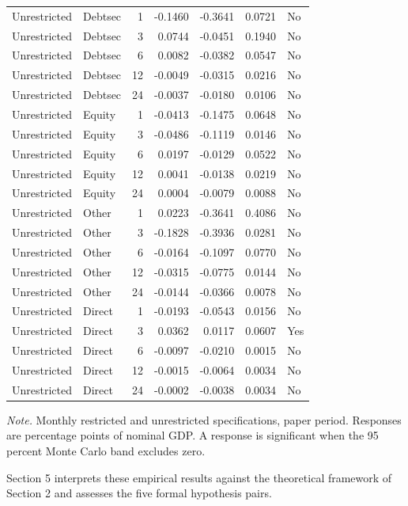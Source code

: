 \begin{longtable}{@{}l l r r r r l@{}}
Unrestricted & Debtsec & 1 & -0.1460 & -0.3641 & 0.0721 & No \\
Unrestricted & Debtsec & 3 & 0.0744 & -0.0451 & 0.1940 & No \\
Unrestricted & Debtsec & 6 & 0.0082 & -0.0382 & 0.0547 & No \\
Unrestricted & Debtsec & 12 & -0.0049 & -0.0315 & 0.0216 & No \\
Unrestricted & Debtsec & 24 & -0.0037 & -0.0180 & 0.0106 & No \\
Unrestricted & Equity & 1 & -0.0413 & -0.1475 & 0.0648 & No \\
Unrestricted & Equity & 3 & -0.0486 & -0.1119 & 0.0146 & No \\
Unrestricted & Equity & 6 & 0.0197 & -0.0129 & 0.0522 & No \\
Unrestricted & Equity & 12 & 0.0041 & -0.0138 & 0.0219 & No \\
Unrestricted & Equity & 24 & 0.0004 & -0.0079 & 0.0088 & No \\
Unrestricted & Other & 1 & 0.0223 & -0.3641 & 0.4086 & No \\
Unrestricted & Other & 3 & -0.1828 & -0.3936 & 0.0281 & No \\
Unrestricted & Other & 6 & -0.0164 & -0.1097 & 0.0770 & No \\
Unrestricted & Other & 12 & -0.0315 & -0.0775 & 0.0144 & No \\
Unrestricted & Other & 24 & -0.0144 & -0.0366 & 0.0078 & No \\
Unrestricted & Direct & 1 & -0.0193 & -0.0543 & 0.0156 & No \\
Unrestricted & Direct & 3 & 0.0362 & 0.0117 & 0.0607 & Yes \\
Unrestricted & Direct & 6 & -0.0097 & -0.0210 & 0.0015 & No \\
Unrestricted & Direct & 12 & -0.0015 & -0.0064 & 0.0034 & No \\
Unrestricted & Direct & 24 & -0.0002 & -0.0038 & 0.0034 & No \\
  \bottomrule
\end{longtable}
\FloatBarrier

\begin{center}
  \small\textit{Note.} Monthly restricted and unrestricted specifications, paper period. Responses are percentage points of nominal GDP. A response is significant when the 95 percent Monte Carlo band excludes zero.
\end{center}

Section 5 interprets these empirical results against the theoretical framework of Section 2 and assesses the five formal hypothesis pairs.
